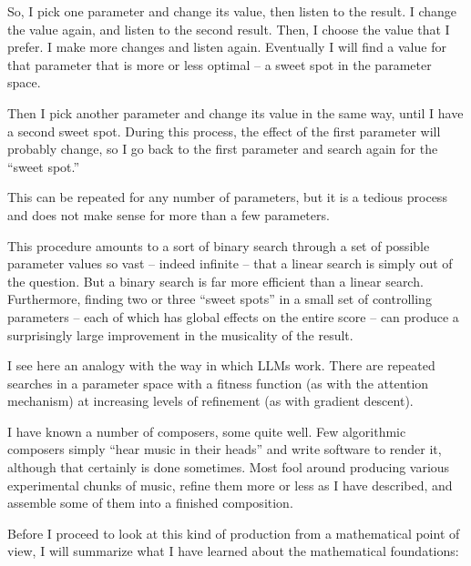 \documentclass[11pt]{scrartcl}
\begin{document}
So, I pick one parameter and change its value, then listen to the result. I change the value again, and listen to the second result. Then, I choose the value that I prefer. I make more changes and listen again. Eventually I will find a value for that parameter that is more or less optimal – a sweet spot in the parameter space.

Then I pick another parameter and change its value in the same way, until I have a second sweet spot. During this process, the effect of the first parameter will probably change, so I go back to the first parameter and search again for the “sweet spot.”

This can be repeated for any number of parameters, but it is a tedious process and does not make sense for more than a few parameters.

This procedure amounts to a sort of binary search through a set of possible parameter values so vast – indeed infinite – that a linear search is simply out of the question. But a binary search is far more efficient than a linear search. Furthermore, finding two or three ``sweet spots'' in a small set of controlling parameters – each of which has global effects on the entire score – can produce a surprisingly large improvement in the musicality of the result.

I see here an analogy with the way in which LLMs work. There are repeated searches in a parameter space with a fitness function (as with the attention mechanism) at increasing levels of refinement (as with gradient descent).

I have known a number of composers, some quite well. Few algorithmic composers simply ``hear music in their heads'' and write software to render it, although that certainly is done sometimes. Most fool around producing various experimental chunks of music, refine them more or less as I have described, and assemble some of them into a finished composition.

Before I proceed to look at this kind of production from a mathematical point of view, I will summarize what I have learned about the mathematical foundations:
\end{document}
